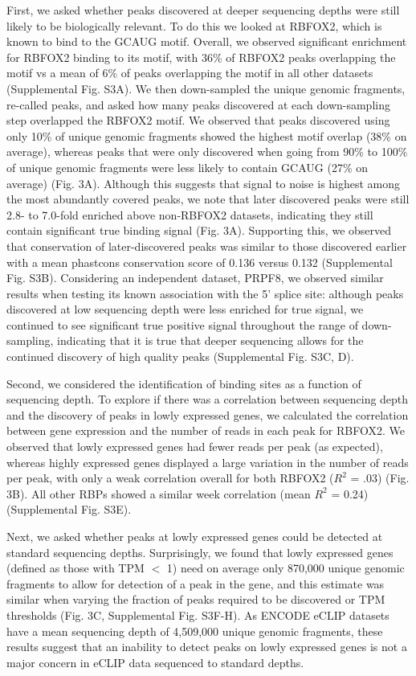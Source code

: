 First, we asked whether peaks discovered at deeper sequencing depths were still likely to be biologically relevant. To do this we looked at RBFOX2, which is known to bind to the GCAUG motif. Overall, we observed significant enrichment for RBFOX2 binding to its motif, with 36\% of RBFOX2 peaks overlapping the motif vs a mean of 6\% of peaks overlapping the motif in all other datasets (Supplemental Fig. S3A). We then down-sampled the unique genomic fragments, re-called peaks, and asked how many peaks discovered at each down-sampling step overlapped the RBFOX2 motif. We observed that peaks discovered using only 10\% of unique genomic fragments showed the highest motif overlap (38\% on average), whereas peaks that were only discovered when going from 90\% to 100\% of unique genomic fragments were less likely to contain GCAUG (27\% on average) (Fig. 3A). Although this suggests that signal to noise is highest among the most abundantly covered peaks, we note that later discovered peaks were still 2.8- to 7.0-fold enriched above non-RBFOX2 datasets, indicating they still contain significant true binding signal (Fig. 3A). Supporting this, we observed that conservation of later-discovered peaks was similar to those discovered earlier with a mean phastcons conservation score of 0.136 versus 0.132 (Supplemental Fig. S3B). Considering an independent dataset, PRPF8, we observed similar results when testing its known association with the 5’ splice site: although peaks discovered at low sequencing depth were less enriched for true signal, we continued to see significant true positive signal throughout the range of down-sampling, indicating that it is true that deeper sequencing allows for the continued discovery of high quality peaks (Supplemental Fig. S3C, D).

Second, we considered the identification of binding sites as a function of sequencing depth. To explore if there was a correlation between sequencing depth and the discovery of peaks in lowly expressed genes, we calculated the correlation between gene expression and the number of reads in each peak for RBFOX2. We observed that lowly expressed genes had fewer reads per peak (as expected), whereas highly expressed genes displayed a large variation in the number of reads per peak, with only a weak correlation overall for both RBFOX2 ($R^2$ = .03) (Fig. 3B). All other RBPs showed a similar week correlation (mean $R^2$ = 0.24) (Supplemental Fig. S3E).

Next, we asked whether peaks at lowly expressed genes could be detected at standard sequencing depths. Surprisingly, we found that lowly expressed genes (defined as those with TPM $<$ 1) need on average only 870,000 unique genomic fragments to allow for detection of a peak in the gene, and this estimate was similar when varying the fraction of peaks required to be discovered or TPM thresholds (Fig. 3C, Supplemental Fig. S3F-H). As ENCODE eCLIP datasets have a mean sequencing depth of 4,509,000 unique genomic fragments, these results suggest that an inability to detect peaks on lowly expressed genes is not a major concern in eCLIP data sequenced to standard depths.

